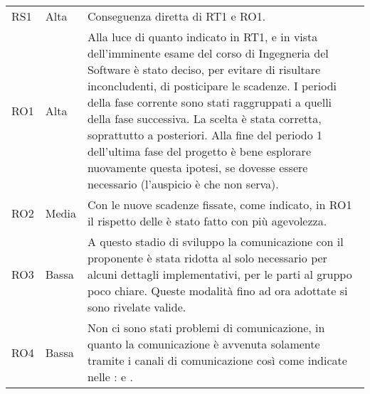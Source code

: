 {\begin{longtable}{C{2cm} C{3cm} C{10cm}}
RS1 &
Alta &
Conseguenza diretta di RT1 e RO1. \\

RO1 &
Alta &
Alla luce di quanto indicato in RT1, e in vista dell'imminente esame del corso di Ingegneria del Software è stato deciso, per evitare di risultare inconcludenti, di posticipare le scadenze. I periodi della fase corrente sono stati raggruppati a quelli della fase successiva. La scelta è stata corretta, soprattutto a posteriori. Alla fine del periodo 1 dell'ultima fase del progetto è bene esplorare nuovamente questa ipotesi, se dovesse essere necessario (l'auspicio è che non serva). \\

RO2 &
Media &
Con le nuove scadenze fissate, come indicato, in RO1 il rispetto delle  è stato fatto con più agevolezza. \\

RO3 &
Bassa &
A questo stadio di sviluppo la comunicazione con il proponente è stata ridotta al solo necessario per alcuni dettagli implementativi, per le parti al gruppo poco chiare. Queste modalità fino ad ora adottate si sono rivelate valide. \\

RO4 &
Bassa &
Non ci sono stati problemi di comunicazione, in quanto la comunicazione è avvenuta solamente tramite i canali di comunicazione così come indicate nelle \NdP{}:  e . \\

\end{longtable}	
}
